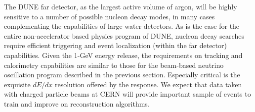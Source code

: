 The DUNE far detector, as the largest active volume of argon, will be highly sensitive to a number of possible nucleon decay modes, in many cases complementing the capabilities of large water detectors.  
As is the case for the entire non-accelerator based physics program of DUNE, nucleon decay searches require efficient triggering and event localization (within the far detector) capabilities.  Given the 1-GeV energy release, the requirements on tracking and calorimetry capabilities are similar to those for the beam-based neutrino oscillation program described in the previous section.  Especially critical is the exquisite $dE/dx$ resolution offered by the \lartpc response. 
We expect that  data taken with charged particle beams at CERN will provide important sample of events to train and improve on reconstruction algorithms. 


